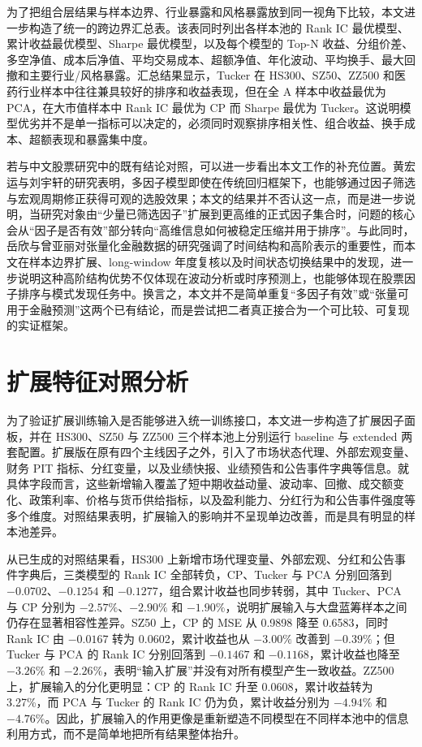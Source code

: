 为了把组合层结果与样本边界、行业暴露和风格暴露放到同一视角下比较，本文进一步构造了统一的跨边界汇总表。该表同时列出各样本池的 Rank IC 最优模型、累计收益最优模型、Sharpe 最优模型，以及每个模型的 Top-N 收益、分组价差、多空净值、成本后净值、平均交易成本、超额净值、年化波动、平均换手、最大回撤和主要行业/风格暴露。汇总结果显示，Tucker 在 HS300、SZ50、ZZ500 和医药行业样本中往往兼具较好的排序和收益表现，但在全 A 样本中收益最优为 PCA，在大市值样本中 Rank IC 最优为 CP 而 Sharpe 最优为 Tucker。这说明模型优劣并不是单一指标可以决定的，必须同时观察排序相关性、组合收益、换手成本、超额表现和暴露集中度。

若与中文股票研究中的既有结论对照，可以进一步看出本文工作的补充位置。黄宏运与刘宇轩的研究表明，多因子模型即使在传统回归框架下，也能够通过因子筛选与宏观周期修正获得可观的选股效果；本文的结果并不否认这一点，而是进一步说明，当研究对象由“少量已筛选因子”扩展到更高维的正式因子集合时，问题的核心会从“因子是否有效”部分转向“高维信息如何被稳定压缩并用于排序”。与此同时，岳欣与曾亚丽对张量化金融数据的研究强调了时间结构和高阶表示的重要性，而本文在样本边界扩展、long-window 年度复核以及时间状态切换结果中的发现，进一步说明这种高阶结构优势不仅体现在波动分析或时序预测上，也能够体现在股票因子排序与模式发现任务中。换言之，本文并不是简单重复“多因子有效”或“张量可用于金融预测”这两个已有结论，而是尝试把二者真正接合为一个可比较、可复现的实证框架。

\section{扩展特征对照分析}

为了验证扩展训练输入是否能够进入统一训练接口，本文进一步构造了扩展因子面板，并在 HS300、SZ50 与 ZZ500 三个样本池上分别运行 baseline 与 extended 两套配置。扩展版在原有四个主线因子之外，引入了市场状态代理、外部宏观变量、财务 PIT 指标、分红变量，以及业绩快报、业绩预告和公告事件字典等信息。就具体字段而言，这些新增输入覆盖了短中期收益动量、波动率、回撤、成交额变化、政策利率、价格与货币供给指标，以及盈利能力、分红行为和公告事件强度等多个维度。对照结果表明，扩展输入的影响并不呈现单边改善，而是具有明显的样本池差异。

从已生成的对照结果看，HS300 上新增市场代理变量、外部宏观、分红和公告事件字典后，三类模型的 Rank IC 全部转负，CP、Tucker 与 PCA 分别回落到 $-0.0702$、$-0.1254$ 和 $-0.1277$，组合累计收益也同步转弱，其中 Tucker、PCA 与 CP 分别为 $-2.57\%$、$-2.90\%$ 和 $-1.90\%$，说明扩展输入与大盘蓝筹样本之间仍存在显著相容性差异。SZ50 上，CP 的 MSE 从 0.9898 降至 0.6583，同时 Rank IC 由 $-0.0167$ 转为 0.0602，累计收益也从 $-3.00\%$ 改善到 $-0.39\%$；但 Tucker 与 PCA 的 Rank IC 分别回落到 $-0.1467$ 和 $-0.1168$，累计收益也降至 $-3.26\%$ 和 $-2.26\%$，表明“输入扩展”并没有对所有模型产生一致收益。ZZ500 上，扩展输入的分化更明显：CP 的 Rank IC 升至 0.0608，累计收益转为 3.27\%，而 PCA 与 Tucker 的 Rank IC 仍为负，累计收益分别为 $-4.94\%$ 和 $-4.76\%$。因此，扩展输入的作用更像是重新塑造不同模型在不同样本池中的信息利用方式，而不是简单地把所有结果整体抬升。

